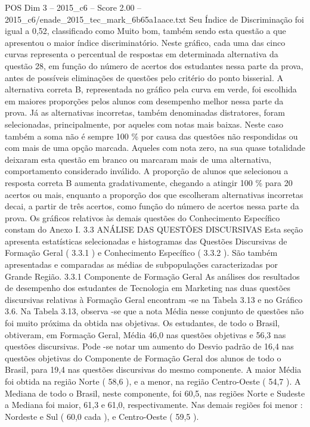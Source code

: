 \begin{textsample}{POS Dim 3 – 2015\_c6 – Score 2.00 – 2015\_c6/enade\_2015\_tec\_mark\_6b65a1aace.txt}
Seu Índice de Discriminação foi igual a 0,52, classificado como Muito bom, também sendo esta questão a que apresentou o maior índice discriminatório.
Neste gráfico, cada uma das cinco curvas representa o percentual de respostas em determinada alternativa da questão 28, em função do número de acertos dos estudantes nessa parte da prova, antes de possíveis eliminações de questões pelo critério do ponto bisserial.
A alternativa correta B, representada no gráfico pela curva em verde, foi escolhida em maiores proporções pelos alunos com desempenho melhor nessa parte da prova.
Já as alternativas incorretas, também denominadas distratores, foram selecionadas, principalmente, por aqueles com notas mais baixas.
Neste caso também a soma não é sempre 100 \% por causa das questões não respondidas ou com mais de uma opção marcada.
Aqueles com nota zero, na sua quase totalidade deixaram esta questão em branco ou marcaram mais de uma alternativa, comportamento considerado inválido.
A proporção de alunos que selecionou a resposta correta B aumenta gradativamente, chegando a atingir 100 \% para 20 acertos ou mais, enquanto a proporção dos que escolheram alternativas incorretas decai, a partir de três acertos, como função do número de acertos nessa parte da prova.
Os gráficos relativos às demais questões do Conhecimento Específico constam do Anexo I. 3.3 ANÁLISE DAS QUESTÕES DISCURSIVAS Esta seção apresenta estatísticas selecionadas e histogramas das Questões Discursivas de Formação Geral ( 3.3.1 ) e Conhecimento Específico ( 3.3.2 ).
São também apresentadas e comparadas as médias de subpopulações caracterizadas por Grande Região. 3.3.1 Componente de Formação Geral As análises dos resultados de desempenho dos estudantes de Tecnologia em Marketing nas duas questões discursivas relativas à Formação Geral encontram -se na Tabela 3.13 e no Gráfico 3.6.
Na Tabela 3.13, observa -se que a nota Média nesse conjunto de questões não foi muito próxima da obtida nas objetivas.
Os estudantes, de todo o Brasil, obtiveram, em Formação Geral, Média 46,0 nas questões objetivas e 56,3 nas questões discursivas.
Pode -se notar um aumento do Desvio padrão de 16,4 nas questões objetivas do Componente de Formação Geral dos alunos de todo o Brasil, para 19,4 nas questões discursivas do mesmo componente.
A maior Média foi obtida na região Norte ( 58,6 ), e a menor, na região Centro-Oeste ( 54,7 ).
A Mediana de todo o Brasil, neste componente, foi 60,5, nas regiões Norte e Sudeste a Mediana foi maior, 61,3 e 61,0, respectivamente.
Nas demais regiões foi menor : Nordeste e Sul ( 60,0 cada ), e Centro-Oeste ( 59,5 ).

\end{textsample}
